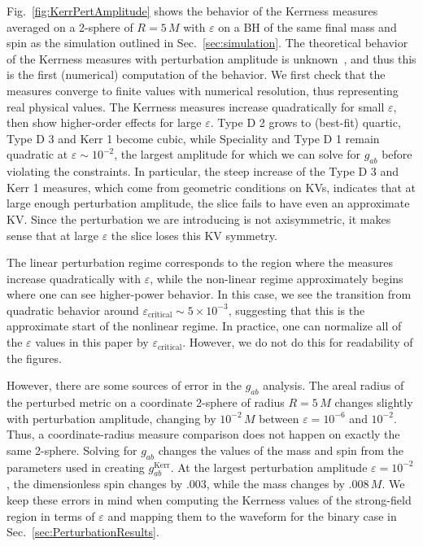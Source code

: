 
Fig.~\ref{fig:KerrPertAmplitude} shows the behavior of the Kerrness measures averaged on a 2-sphere of $R=5\,M$ with $\varepsilon$ on a BH of the same final mass and spin as the simulation outlined in Sec.~\ref{sec:simulation}. The theoretical behavior of the Kerrness measures with perturbation amplitude is unknown~\cite{loboprivate, Ionescu:2014cta}, and thus this is the first (numerical) computation of the behavior. We first check that the measures converge to finite values with numerical resolution, thus representing real physical values. The Kerrness measures increase quadratically for small $\varepsilon$, then show higher-order effects for large $\varepsilon$. Type D 2 grows to (best-fit) quartic, Type D 3 and Kerr 1 become cubic, while Speciality and Type D 1 remain quadratic at $\varepsilon \sim 10^{-2}$, the largest amplitude for which we can solve for $g_{ab}$ before violating the constraints. In particular, the steep increase of the Type D 3 and Kerr 1 measures, which come from geometric conditions on KVs, indicates that at large enough perturbation amplitude, the slice fails to have even an approximate KV. Since the perturbation we are introducing is not axisymmetric, it makes sense that at large $\varepsilon$ the slice loses this KV symmetry. 

The linear perturbation regime corresponds to the region where the measures increase quadratically with $\varepsilon$, while the non-linear regime approximately begins where one can see higher-power behavior. In this case, we see the transition from quadratic behavior around $\varepsilon_\mathrm{critical} \sim 5 \times 10^{-3}$, suggesting that this is the approximate start of the nonlinear regime. In practice, one can normalize all of the $\varepsilon$ values in this paper by $\varepsilon_\mathrm{critical}$. However, we do not do this for readability of the figures. 

However, there are some sources of error in the $g_{ab}$ analysis. The areal radius of the perturbed metric on a coordinate 2-sphere of radius $R = 5\,M$ changes slightly with perturbation amplitude, changing by $10^{-2}\,M$ between $\varepsilon = 10^{-6}$ and $10^{-2}$. Thus, a coordinate-radius measure comparison does not happen on exactly the same 2-sphere. Solving for $g_{ab}$ changes the values of the mass and spin from the parameters used in creating $g_{ab}^\mathrm{Kerr}$. At the largest perturbation amplitude $\varepsilon = 10^{-2}$, the dimensionless spin changes by $.003$, while the mass changes by $.008\,M$. We keep these errors in mind when computing the Kerrness values of the strong-field region in terms of $\varepsilon$ and mapping them to the waveform for the binary case in Sec.~\ref{sec:PerturbationResults}. 

